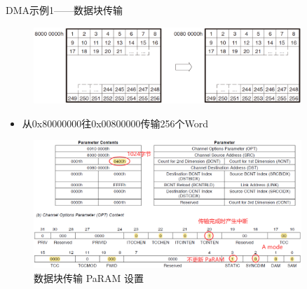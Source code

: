 \documentclass[10pt]{ctexbeamer}
\begin{document}
    \begin{frame}[allowframebreaks]{DMA示例1——数据块传输}
        \begin{figure}
            \centering
            \includegraphics[width=0.9\textwidth]{summary/12.eps}
        \end{figure}
        \vspace{0.5cm}
        \begin{itemize}
            \item 从0x80000000往0x00800000传输256个Word
        \end{itemize}
        
        \begin{figure}
            \centering
            \includegraphics[width=0.9\textwidth]{summary/13.eps}
            \caption{数据块传输 PaRAM 设置}
        \end{figure}
    \end{frame}
\end{document}
